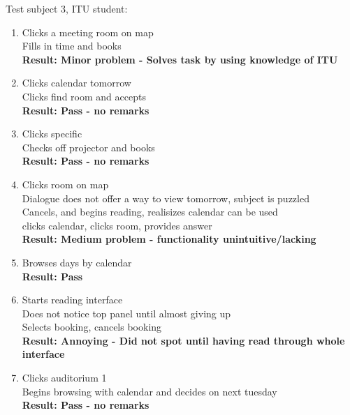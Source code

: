 \begin{enumerate}
{Test subject 3, ITU student:
\begin{enumerate}
\item Clicks a meeting room on map \\
Fills in time and books\\
\textbf{Result: Minor problem - Solves task by using knowledge of ITU}
\item Clicks calendar tomorrow \\
Clicks find room and accepts \\
\textbf{Result: Pass - no remarks}
\item Clicks specific \\
Checks off projector and books \\
\textbf{Result: Pass - no remarks}
\item Clicks room on map \\
Dialogue does not offer a way to view tomorrow, subject is puzzled \\
Cancels, and begins reading, realisizes calendar can be used \\
clicks calendar, clicks room, provides answer \\
\textbf{Result: Medium problem - functionality unintuitive/lacking}
\item Browses days by calendar \\
\textbf{Result: Pass}
\item Starts reading interface \\
Does not notice top panel until almost giving up \\
Selects booking, cancels booking \\
\textbf{Result: Annoying - Did not spot until having read through whole interface}
\item Clicks auditorium 1 \\
Begins browsing with calendar and decides on next tuesday \\
\textbf{Result: Pass - no remarks}
\end{enumerate}

}
\end{enumerate}
